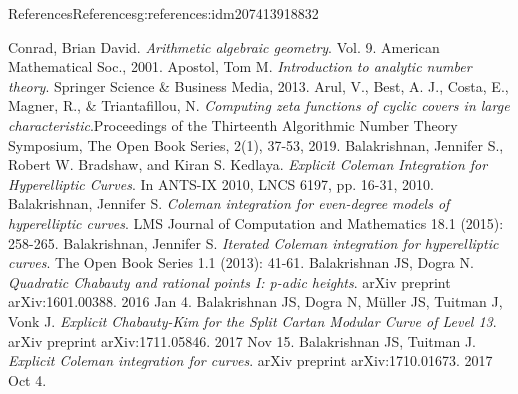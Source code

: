 \documentclass[oneside,10pt,]{book}
\numberwithin{equation}{section}
\begin{document}
%
%
%
\typeout{************************************************}
\typeout{************************************************}
%
\begin{references-chapter-numberless}{References}{}{References}{}{}{g:references:idm207413918832}
\begin{thebibliography}{9}
\hypertarget{x:biblio:bib-arith-alg-geom}{}Conrad, Brian David. \textit{Arithmetic algebraic geometry}. Vol. 9. American Mathematical Soc., 2001.
\hypertarget{x:biblio:bib-apostol}{}Apostol, Tom M. \textit{Introduction to analytic number theory}. Springer Science \& Business Media, 2013.
\hypertarget{x:biblio:bib-arul-bcmt}{}Arul, V., Best, A. J., Costa, E., Magner, R., \& Triantafillou, N. \textit{Computing zeta functions of cyclic covers in large characteristic}.Proceedings of the Thirteenth Algorithmic Number Theory Symposium, The Open Book Series, 2(1), 37-53, 2019.
\hypertarget{x:biblio:bib-balakrishnan-bradshaw-kedlaya}{}Balakrishnan, Jennifer S., Robert W. Bradshaw, and Kiran S. Kedlaya. \textit{Explicit Coleman Integration for Hyperelliptic Curves}. In ANTS-IX 2010, LNCS 6197, pp. 16-31, 2010.
\hypertarget{x:biblio:bib-balakrishnan-even}{}Balakrishnan, Jennifer S. \textit{Coleman integration for even-degree models of hyperelliptic curves}. LMS Journal of Computation and Mathematics 18.1 (2015): 258-265.
\hypertarget{x:biblio:bib-balakrishnan-iterated}{}Balakrishnan, Jennifer S. \textit{Iterated Coleman integration for hyperelliptic curves}. The Open Book Series 1.1 (2013): 41-61.
\hypertarget{x:biblio:bib-balakrishnan-dogra}{}Balakrishnan JS, Dogra N. \textit{Quadratic Chabauty and rational points I: p-adic heights}. arXiv preprint arXiv:1601.00388. 2016 Jan 4.
\hypertarget{x:biblio:bib-balakrishnan-dogra-muller-tuitman-vonk}{}Balakrishnan JS, Dogra N, Müller JS, Tuitman J, Vonk J. \textit{Explicit Chabauty-Kim for the Split Cartan Modular Curve of Level 13}. arXiv preprint arXiv:1711.05846. 2017 Nov 15.
\hypertarget{x:biblio:bib-balakrishnan-tuitman}{}Balakrishnan JS, Tuitman J. \textit{Explicit Coleman integration for curves}. arXiv preprint arXiv:1710.01673. 2017 Oct 4.

\end{thebibliography}
\end{references-chapter-numberless}
\end{document}
